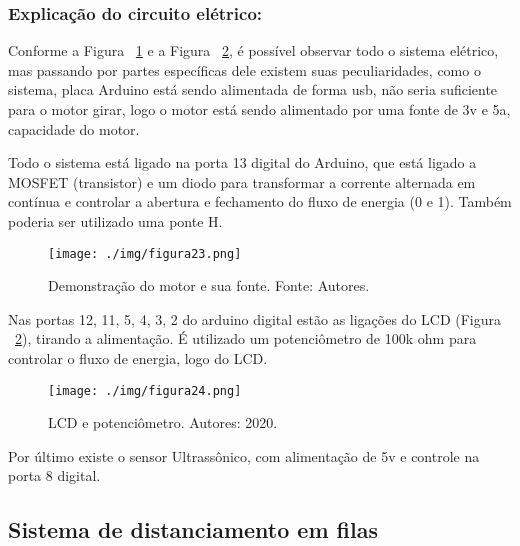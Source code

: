 \documentclass[10pt,twocolumn,letterpaper]{article}
\begin{document}
\subsubsection{Explicação do circuito elétrico:}

Conforme a Figura ~\ref{fig:figura23} e a Figura ~\ref{fig:figura24}, é possível observar todo o sistema elétrico, mas passando por partes específicas dele existem suas peculiaridades, como o sistema, placa Arduino está sendo alimentada de forma usb, não seria suficiente para o motor girar, logo o motor está sendo alimentado por uma fonte de  3v e 5a, capacidade do motor.

Todo o sistema está ligado na porta 13 digital do Arduino, que está ligado a MOSFET (transistor) e um diodo para transformar a corrente alternada em contínua e controlar a abertura e fechamento do fluxo de energia (0 e 1). Também poderia ser utilizado uma ponte H. 

{
\begin{figure}[!h]
\begin{center}
   \texttt{[image: ./img/figura23.png]}
\end{center}
   \caption{  Demonstração do motor e sua fonte. Fonte: Autores.  }
\label{fig:figura23}
\end{figure}
} 

Nas portas 12, 11, 5, 4, 3, 2 do arduino digital estão as ligações do LCD (Figura ~\ref{fig:figura24}), tirando a alimentação. É utilizado um potenciômetro de 100k ohm para controlar o fluxo de energia, logo do LCD.

{
\begin{figure}[!h]
\begin{center}
   \texttt{[image: ./img/figura24.png]}
\end{center}
   \caption{   LCD e potenciômetro. Autores: 2020.  }
\label{fig:figura24}
\end{figure}
} 

Por último existe o sensor Ultrassônico, com alimentação de 5v e controle na porta 8 digital. 


\subsection{Sistema de distanciamento em filas}
\end{document}
